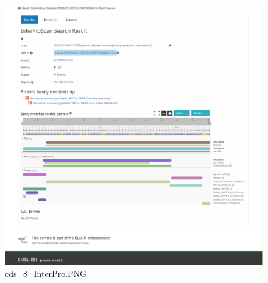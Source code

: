\documentclass[supercite]{HustGraduPaper}
\begin{document}
	\begin{figure}[H]
		\centering
		\includegraphics[width=1\textwidth]{./material/practice2/cds_8/InterPro.png}
		\caption{cds\_8\_InterPro.PNG}
	\end{figure}
\end{document}
